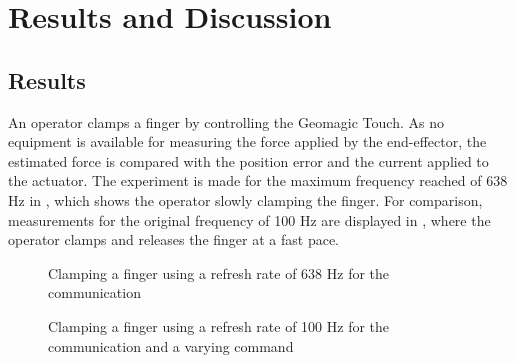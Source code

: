 \chapter{Results and Discussion}\label{cha:discussion}





\section{Results}



An operator clamps a finger by controlling the Geomagic Touch. As no equipment is available for measuring the force applied by the end-effector, the estimated force is compared with the position error and the current applied to the actuator. The experiment is made for the maximum frequency reached of 638 Hz in , which shows the operator slowly clamping the finger. For comparison, measurements for the original frequency of 100 Hz are displayed in , where the operator clamps and releases the finger at a fast pace.


\begin{figure}[H]
  
  \caption{Clamping a finger using a refresh rate of 638 Hz for the communication}
  \label{fig:fbkm}
\end{figure}

\begin{figure}[H]
  
  \caption{Clamping a finger using a refresh rate of 100 Hz for the communication and a varying command}
  \label{fig:fbkm_100}
\end{figure}

